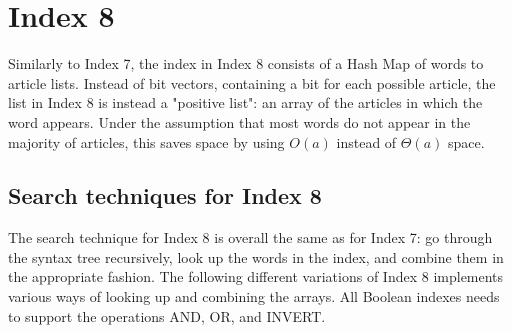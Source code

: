 \section{Index 8}
Similarly to Index 7, the index in Index 8 consists of a Hash Map of words to article lists. Instead of bit vectors, containing a bit for each possible article, the list in Index 8 is instead a "positive list": an array of the articles in which the word appears. Under the assumption that most words do not appear in the majority of articles, this saves space by using $O(a)$ instead of $\Theta(a)$ space. 



\subsection{Search techniques for Index 8}

The search technique for Index 8 is overall the same as for Index 7: go through the syntax tree recursively, look up the words in the index, and combine them in the appropriate fashion. The following different variations of Index 8 implements various ways of looking up and combining the arrays. All Boolean indexes needs to support the operations AND, OR, and INVERT. 

